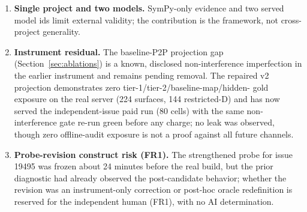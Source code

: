 \begin{enumerate}[leftmargin=1.7em,itemsep=3pt,topsep=3pt]
  number, so identity blinding is partial.
  \item \textbf{Single project and two models.} SymPy-only evidence and two
  served model ids limit external validity; the contribution is the framework,
  not cross-project generality.
  \item \textbf{Instrument residual.} The baseline-P2P projection gap
  (Section~\ref{sec:ablations}) is a known, disclosed non-interference
  imperfection in the earlier instrument and remains pending removal. The
  repaired v2 projection demonstrates zero tier-1/tier-2/baseline-map/hidden-
  gold exposure on the real server (224 surfaces, 144 restricted-D) and has now
  served the independent-issue paid run (80 cells) with the same non-
  interference gate re-run green before any charge; no leak was observed,
  though zero offline-audit exposure is not a proof against all future
  channels.
  \item \textbf{Probe-revision construct risk (FR1).} The strengthened probe
  for issue 19495 was frozen about 24 minutes before the real build, but the
  prior diagnostic had already observed the post-candidate behavior; whether the
  revision was an instrument-only correction or post-hoc oracle redefinition is
  reserved for the independent human (FR1), with no AI determination.
\end{enumerate}
